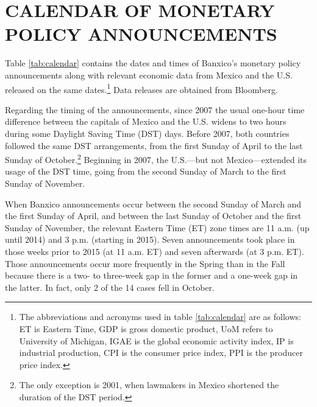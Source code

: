 \titleformat{\section}{\large\bfseries}{}{0pt}{\appendixname\quad\thesection:\quad}

\setcounter{footnote}{0} %
\renewcommand{\thetable}{\thesection\arabic{table}}
\renewcommand\thefigure{\thesection\arabic{figure}}
\renewcommand{\theequation}{\thesection\arabic{equation}}


\section{CALENDAR OF MONETARY POLICY ANNOUNCEMENTS} \label{sec:calendar}
\sectitlespace

Table \ref{tab:calendar} contains the dates and times of Banxico's monetary policy announcements along with relevant economic data from Mexico and the U.S. released on the same dates.\footnote{ The abbreviations and acronyms used in table \ref{tab:calendar} are as follows: ET is Eastern Time, GDP is gross domestic product, UoM refers to University of Michigan, IGAE is the global economic activity index, IP is industrial production, CPI is the consumer price index, PPI is the producer price index.} Data releases are obtained from Bloomberg. 

Regarding the timing of the announcements, since 2007 the usual one-hour time difference between the capitals of Mexico and the U.S. widens to two hours during some Daylight Saving Time (DST) days. Before 2007, both countries followed the same DST arrangements, from the first Sunday of April to the last Sunday of October.\footnote{ The only exception is 2001, when lawmakers in Mexico shortened the duration of the DST period.} Beginning in 2007, the U.S.---but not Mexico---extended its usage of the DST time, going from the second Sunday of March to the first Sunday of November.

When Banxico announcements occur between the second Sunday of March and the first Sunday of April, and between the last Sunday of October and the first Sunday of November, the relevant Eastern Time (ET) zone times are 11 a.m. (up until 2014) and 3 p.m. (starting in 2015). Seven announcements took place in those weeks prior to 2015 (at 11 a.m. ET) and seven afterwards (at 3 p.m. ET). Those announcements occur more frequently in the Spring than in the Fall because there is a two- to three-week gap in the former and a one-week gap in the latter. In fact, only 2 of the 14 cases fell in October.

